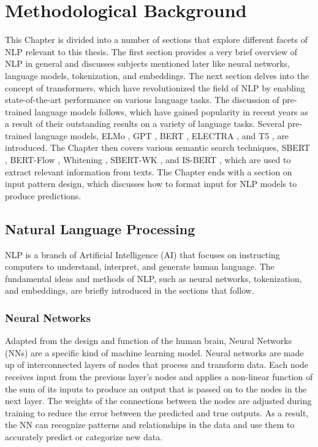 \chapter{Methodological Background}\label{methods}

This Chapter is divided into a number of sections that explore different facets of NLP relevant to this thesis. The first section provides a very brief overview of NLP in general and discusses subjects mentioned later like neural networks, language models, tokenization, and embeddings. The next section delves into the concept of transformers, which have revolutionized the field of NLP by enabling state-of-the-art performance on various language tasks. The discussion of pre-trained language models follows, which have gained popularity in recent years as a result of their outstanding results on a variety of language tasks. Several pre-trained language models, ELMo \citep{peters2018elmo}, GPT \citep{radford2018gpt}, BERT \citep{devlin2018bert}, ELECTRA \citep{clark2020electra}, and T5 \citep{xue2020mt5}, are introduced. The Chapter then covers various semantic search techniques, SBERT \citep{reimers2019sbert}, BERT-Flow \citep{li2020bertflow}, Whitening \citep{huang2021whiteningbert}, SBERT-WK \citep{wang2020sbertwk}, and IS-BERT \citep{zhang2020isbert}, which are used to extract relevant information from texts. The Chapter ends with a section on input pattern design, which discusses how to format input for NLP models to produce predictions.

\section{Natural Language Processing}

NLP is a branch of Artificial Intelligence (AI) that focuses on instructing computers to understand, interpret, and generate human language. The fundamental ideas and methods of NLP, such as neural networks, tokenization, and embeddings, are briefly introduced in the sections that follow.

\subsection*{Neural Networks}

Adapted from the design and function of the human brain, Neural Networks (NNs) are a specific kind of machine learning model. Neural networks are made up of interconnected layers of nodes that process and transform data. Each node receives input from the previous layer's nodes and applies a non-linear function of the sum of its inputs to produce an output that is passed on to the nodes in the next layer. The weights of the connections between the nodes are adjusted during training to reduce the error between the predicted and true outputs. As a result, the NN can recognize patterns and relationships in the data and use them to accurately predict or categorize new data.

